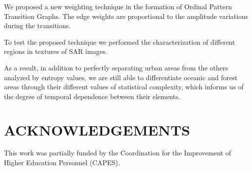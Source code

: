 \documentclass{isprs}
\begin{document}
	We proposed a new weighting technique in the formation of Ordinal Pattern Transition Graphs.
	The edge weights are proportional to the amplitude variations during the transitions.
	
	To test the proposed technique we performed the characterization of different regions in textures of SAR images.
	
	As a result, in addition to perfectly separating urban areas from the others analyzed by entropy values, we are still able to differentiate oceanic and forest areas through their different values of statistical complexity, which informs us of the degree of temporal dependence between their elements.
	
	
	
	
	\section*{ACKNOWLEDGEMENTS}\label{ACKNOWLEDGEMENTS}
	
	This work was partially funded by the Coordination for the Improvement of Higher Education Personnel (CAPES).
	
	
\end{document}
